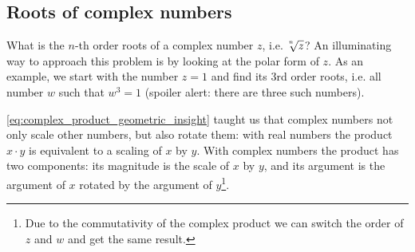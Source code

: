 \subsection{Roots of complex numbers}
What is the $n$-th order roots of a complex number $z$, i.e. $\nroot{n}{z}$? An illuminating way to approach this problem is by looking at the polar form of $z$. As an example, we start with the number $z=1$ and find its 3rd order roots, i.e. all number $w$ such that $w^{3}=1$ (spoiler alert: there are three such numbers).

\autoref{eq:complex_product_geometric_insight} taught us that complex numbers not only scale other numbers, but also rotate them: with real numbers the product $x \cdot y$ is equivalent to a scaling of $x$ by $y$. With complex numbers the product has two components: its magnitude is the scale of $x$ by $y$, and its argument is the argument of $x$ rotated by the argument of $y$\footnote{Due to the commutativity of the complex product we can switch the order of $z$ and $w$ and get the same result.}.

